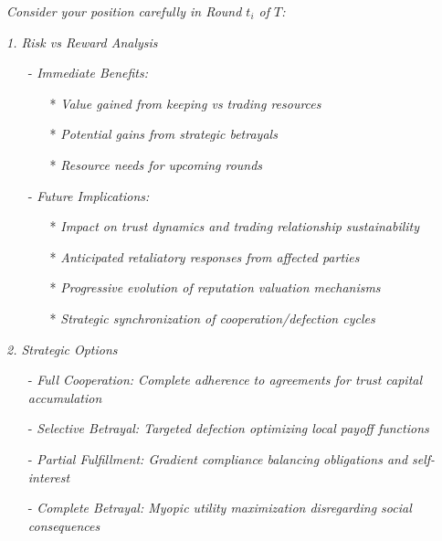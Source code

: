 \textit{Consider your position carefully in Round $t_i$ of $T$:}

\textit{1. Risk vs Reward Analysis}
\begin{itemize}
    \item[-] \textit{Immediate Benefits:}
    \begin{itemize}
        \item[*] \textit{Value gained from keeping vs trading resources}
        \item[*] \textit{Potential gains from strategic betrayals}
        \item[*] \textit{Resource needs for upcoming rounds}
    \end{itemize}

    \item[-] \textit{Future Implications:}
    \begin{itemize}
        \item[*] \textit{Impact on trust dynamics and trading relationship sustainability}
        \item[*] \textit{Anticipated retaliatory responses from affected parties}
        \item[*] \textit{Progressive evolution of reputation valuation mechanisms}
        \item[*] \textit{Strategic synchronization of cooperation/defection cycles}
    \end{itemize}
\end{itemize}

\textit{2. Strategic Options}
\begin{itemize}
\item[-] \textit{Full Cooperation: Complete adherence to agreements for trust capital accumulation}
\item[-] \textit{Selective Betrayal: Targeted defection optimizing local payoff functions}
\item[-] \textit{Partial Fulfillment: Gradient compliance balancing obligations and self-interest}
\item[-] \textit{Complete Betrayal: Myopic utility maximization disregarding social consequences}
\end{itemize}

